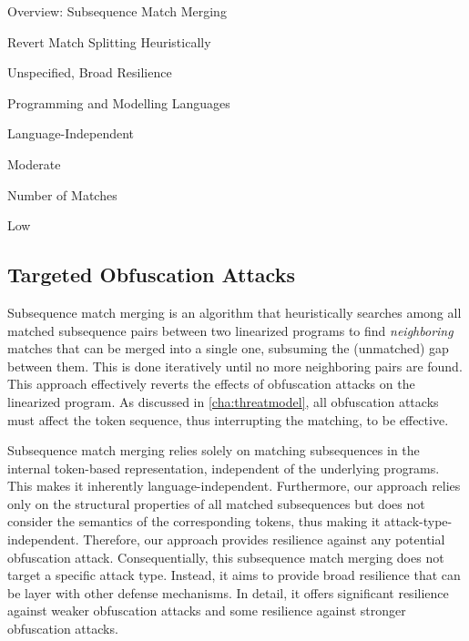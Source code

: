 \begin{factsheet}{Overview: Subsequence Match Merging} 
    \begin{description}[style=multiline,leftmargin=5.5cm]
        \item[Core Principle] Revert Match Splitting Heuristically
        \item[Targeted Obfuscation Attack] Unspecified, Broad Resilience
        \item[Language Family] Programming and Modelling Languages
        \item[Language Dependence] Language-Independent
        \item[Performance Impact] Moderate
        \item[Main Scalability Determinant] Number of Matches
        \item[Integration Complexity] Low
    \end{description}
\end{factsheet}

\subsection{Targeted Obfuscation Attacks}

Subsequence match merging is an algorithm that heuristically searches among all matched subsequence pairs between two linearized programs to find \textit{neighboring} matches that can be merged into a single one, subsuming the (unmatched) gap between them. This is done iteratively until no more neighboring pairs are found. This approach effectively reverts the effects of obfuscation attacks on the linearized program.
As discussed in \autoref{cha:threatmodel}, all obfuscation attacks must affect the token sequence, thus interrupting the matching, to be effective. 

Subsequence match merging relies solely on matching subsequences in the internal token-based representation, independent of the underlying programs. This makes it inherently language-independent. Furthermore, our approach relies only on the structural properties of all matched subsequences but does not consider the semantics of the corresponding tokens, thus making it attack-type-independent.
Therefore, our approach provides resilience against any potential obfuscation attack.
Consequentially, this subsequence match merging does not target a specific attack type. Instead, it aims to provide broad resilience that can be layer with other defense mechanisms.
In detail, it offers significant resilience against weaker obfuscation attacks and some resilience against stronger obfuscation attacks.

